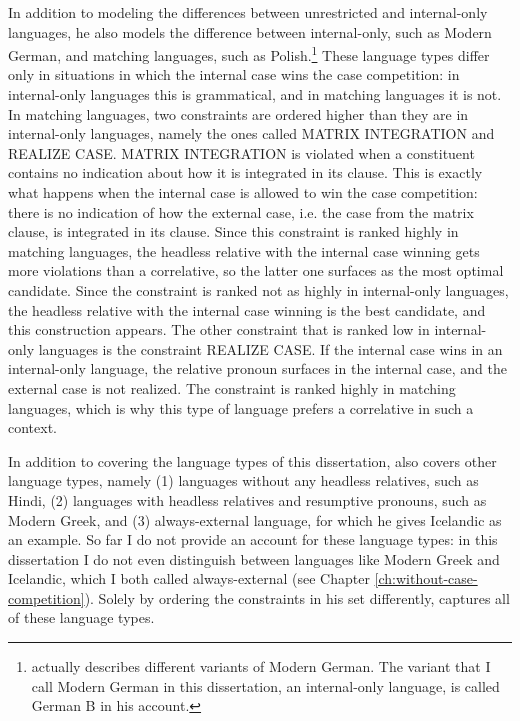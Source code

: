 In addition to modeling the differences between unrestricted and internal-only languages, he also models the difference between internal-only, such as Modern German, and matching languages, such as Polish.\footnote{
\citet{vogel2002} actually describes different variants of Modern German. The variant that I call Modern German in this dissertation, an internal-only language, is called German B in his account.
} These language types differ only in situations in which the internal case wins the case competition: in internal-only languages this is grammatical, and in matching languages it is not.
In matching languages, two constraints are ordered higher than they are in internal-only languages, namely the ones called MATRIX INTEGRATION and REALIZE CASE. MATRIX INTEGRATION is violated when a constituent contains no indication about how it is integrated in its clause. This is exactly what happens when the internal case is allowed to win the case competition: there is no indication of how the external case, i.e. the case from the matrix clause, is integrated in its clause. Since this constraint is ranked highly in matching languages, the headless relative with the internal case winning gets more violations than a correlative, so the latter one surfaces as the most optimal candidate. Since the constraint is ranked not as highly in internal-only languages, the headless relative with the internal case winning is the best candidate, and this construction appears.
The other constraint that is ranked low in internal-only languages is the constraint REALIZE CASE. If the internal case wins in an internal-only language, the relative pronoun surfaces in the internal case, and the external case is not realized. The constraint is ranked highly in matching languages, which is why this type of language prefers a correlative in such a context.

In addition to covering the language types of this dissertation,  also covers other language types, namely (1) languages without any headless relatives, such as Hindi, (2) languages with headless relatives and resumptive pronouns, such as Modern Greek, and (3) always-external language, for which he gives Icelandic as an example. So far I do not provide an account for these language types: in this dissertation I do not even distinguish between languages like Modern Greek and Icelandic, which I both called always-external (see Chapter \ref{ch:without-case-competition}). Solely by ordering the constraints in his set differently, \citet{vogel2002} captures all of these language types.

